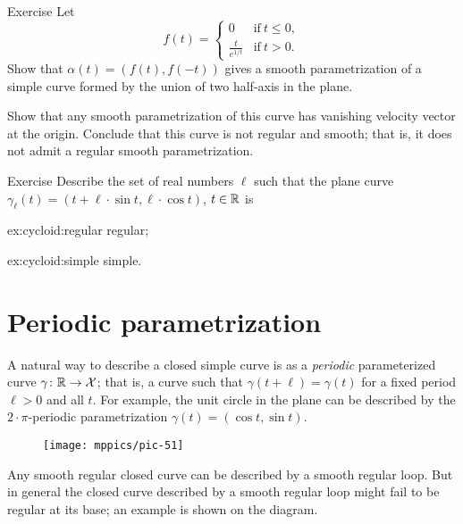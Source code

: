 \begin{thm}{Exercise}\label{ex:L-shape}
Let 
\[f(t)=
\begin{cases}
0&\text{if}\ t\le 0,
\\
\frac{t}{e^{1\!/\!t}}&\text{if}\ t> 0.
\end{cases}
\]
Show that $\alpha(t)=(f(t),f(-t))$ gives a smooth parametrization of a simple curve formed by the union of two half-axis in the plane.

Show that any smooth parametrization of this curve has vanishing velocity vector at the origin.
Conclude that this curve is not regular and smooth;
that is, it does not admit a regular smooth parametrization.
\end{thm}


\begin{thm}{Exercise}\label{ex:cycloid}
Describe the set of real numbers $\ell $
such that the plane curve $\gamma_\ell (t)= (t+\ell \cdot \sin t,\ell \cdot \cos t)$, $t\in\mathbb{R}$ is

\begin{subthm}{ex:cycloid:regular}
regular;
\end{subthm}

\begin{subthm}{ex:cycloid:simple}
simple.
\end{subthm}

\end{thm}

\section{Periodic parametrization}
A natural way to describe a closed simple curve is as a \emph{periodic} parameterized curve $\gamma\colon \mathbb{R}\to \mathcal{X}$; that is, a curve such that $\gamma(t+\ell)=\gamma(t)$ for a fixed period $\ell > 0$ and all $t$.
For example, the unit circle in the plane can be described by the $2{\cdot}\pi$-periodic parametrization $\gamma(t)=(\cos t,\sin t)$.

{

\begin{wrapfigure}{o}{17 mm}
\vskip-3mm
\centering
\texttt{[image: mppics/pic-51]}
\end{wrapfigure}

Any smooth regular closed curve can be described by a smooth regular loop.
But in general the closed curve described by a smooth regular loop might fail to be regular at its base; an example is shown on the diagram.

}

